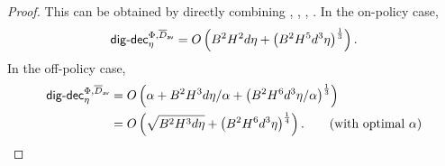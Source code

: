 \begin{proof}
   This can be obtained by directly combining , , , .  In the on-policy case, 
    \begin{align*}
        \mathsf{dig}\text{-}\mathsf{dec}_\eta^{\Phi,\overline{D}_{\mathsf{av}}}  = O\left( B^2H^2d\eta + \left( B^2H^5d^3 \eta \right)^{\frac{1}{3}} \right). 
    \end{align*}
    In the off-policy case, 
    \begin{align*}
        \mathsf{dig}\text{-}\mathsf{dec}_\eta^{\Phi,\overline{D}_{\mathsf{av}}} 
        &= O\left( \alpha + B^2 H^3 d\eta/\alpha + \left(B^2H^6 d^3\eta/\alpha\right)^{\frac{1}{3}}  \right) \\
        &= O\left( \sqrt{B^2H^3 d \eta } + \left(B^2H^6 d^3 \eta\right)^{\frac{1}{4}} \right).   \tag{with optimal $\alpha$}
    \end{align*}
\end{proof}






